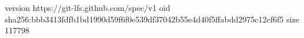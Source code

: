 version https://git-lfs.github.com/spec/v1
oid sha256:bbb3413fdfb1bd1990d59f6f0e539df37042b55e4d40f5ffabdd2975c12cf6f5
size 117798
